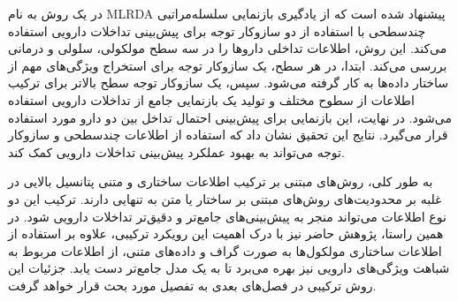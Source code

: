 در \cite{ref_dai2020} یک روش به نام MLRDA پیشنهاد شده است که از یادگیری بازنمایی سلسله‌مراتبی چندسطحی با استفاده از دو سازوکار توجه برای پیش‌بینی تداخلات دارویی استفاده می‌کند. این روش، اطلاعات تداخلی داروها را در سه سطح مولکولی، سلولی و درمانی بررسی می‌کند. ابتدا، در هر سطح، یک سازوکار توجه برای استخراج ویژگی‌های مهم از ساختار داده‌ها به کار گرفته می‌شود. سپس، یک سازوکار توجه سطح بالاتر برای ترکیب اطلاعات از سطوح مختلف و تولید یک بازنمایی جامع از تداخلات دارویی استفاده می‌شود. در نهایت، این بازنمایی برای پیش‌بینی احتمال تداخل بین دو دارو مورد استفاده قرار می‌گیرد. نتایج این تحقیق نشان داد که استفاده از اطلاعات چندسطحی و سازوکار توجه می‌تواند به بهبود عملکرد پیش‌بینی تداخلات دارویی کمک کند.

به طور کلی، روش‌های مبتنی بر ترکیب اطلاعات ساختاری و متنی پتانسیل بالایی در غلبه بر محدودیت‌های روش‌های مبتنی بر ساختار یا متن به تنهایی دارند. ترکیب این دو نوع اطلاعات می‌تواند منجر به پیش‌بینی‌های جامع‌تر و دقیق‌تر تداخلات دارویی شود. در همین راستا، پژوهش حاضر نیز با درک اهمیت این رویکرد ترکیبی، علاوه بر استفاده از اطلاعات ساختاری مولکول‌ها به صورت گراف و داده‌های متنی، از اطلاعات مربوط به شباهت ویژگی‌های دارویی نیز بهره می‌برد تا به یک مدل جامع‌تر دست یابد. جزئیات این روش ترکیبی در فصل‌های بعدی به تفصیل مورد بحث قرار خواهد گرفت.

